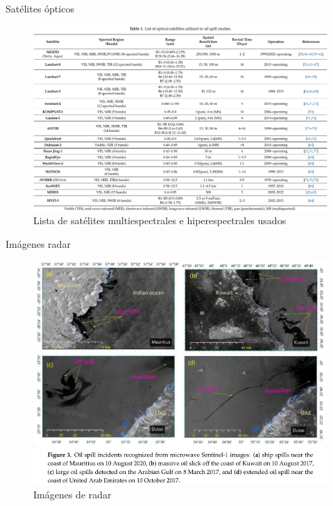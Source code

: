\begin{frame}{Satélites ópticos}
  \begin{figure}
      \centering
      \includegraphics[scale=1.0]{img/section_02/caracteristicas_opticas_02.png}
      \caption{Lista de satélites multiespectrales e hiperespectrales usados}
      \label{fig:optical_features_02}
  \end{figure}
\end{frame}

\begin{frame}{Imágenes radar}
  \begin{figure}
      \centering
      \includegraphics[scale=1.2]{img/section_02/caracteristicas_radar_01.png}
      \caption{Imágenes de radar}
      \label{fig:optical_features_01}
  \end{figure}
\end{frame}

